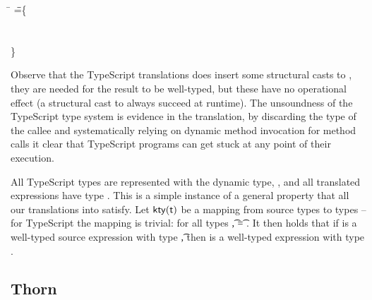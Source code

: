\documentclass[acmsmall, anonymous, authordraft, review]{acmart} %
\begin{document}
\medskip
{\small
\begin{tabbing}
  \hspace{.2cm}
   \= \DynCall{(\SubCast\any{\New\C{}})}\m{\DynCall{(\SubCast\any{\New\C{}})}\n{\New\C{}}} \HS\HS\HS\WHERE\HS \K\HS =\HS\= \class\= \C \{\\
   \>              \>\HS \Mdef\m\x\any\any{~\SubCast\any\this~} \\
   \>              \>\HS  \Mdef\mp\x\any\any{~\x~}\\
   \>                                                              \>  \}   
\end{tabbing}}
\medskip

\noindent
Observe that the TypeScript translations does insert some structural casts
to \any, they are needed for the result to be well-typed, but these have no
operational effect (a structural cast to \any always succeed at runtime).
The unsoundness of the TypeScript type system is evidence in the
translation, by discarding the type of the callee and systematically relying
on dynamic method invocation for method calls it clear that TypeScript
programs can get stuck at any point of their execution.


All TypeScript types are represented with the dynamic \kafka type, \any, and
all translated expressions have type \any.  This is a simple instance of a
general property that all our translations into \kafka satisfy.  Let
\(\kty\t\) be a mapping from source types to \kafka types -- for TypeScript
the mapping is trivial: for all types \t, \kty\t = \src{\any}.  It then
holds that if \e is a well-typed source expression with type \t, then
\TR{\e} is a well-typed \kafka expression with type \kty{\t}. 

% 
% 

\subsection{Thorn}
\end{document}

